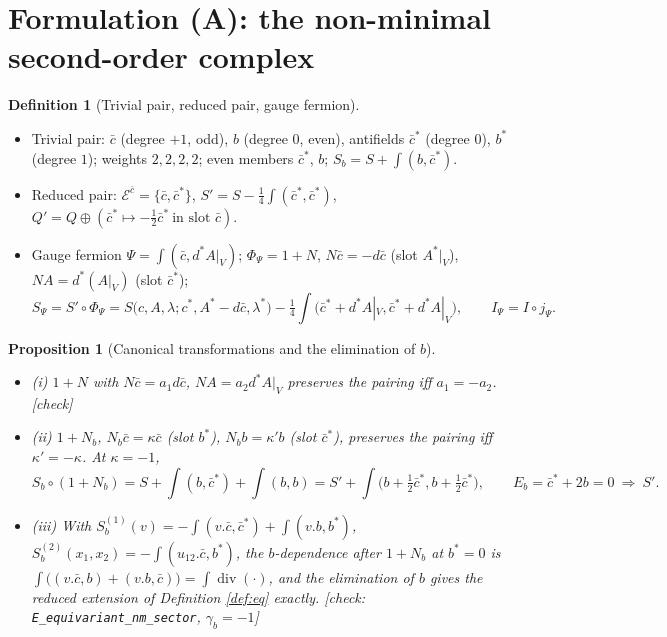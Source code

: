 \documentclass[11pt]{article}
\theoremstyle{plain}
\newtheorem{proposition}[theorem]{Proposition}
\theoremstyle{definition}
\newtheorem{definition}[theorem]{Definition}
\numberwithin{equation}{section}
\begin{document}
\section{Formulation (A): the non-minimal second-order complex}

\begin{definition}[Trivial pair, reduced pair, gauge fermion]
\label{def:A}
\begin{itemize}
\item Trivial pair: $\bar c$ (degree $+1$, odd), $b$ (degree $0$, even), antifields $\bar c^*$ (degree $0$), $b^*$ (degree $1$); weights $2,2,2,2$; even members $\bar c^*$, $b$; $S_b=S+\int(b,\bar c^*)$.
\item Reduced pair: $\mathscr E^{\bar c}=\{\bar c,\bar c^*\}$, $S'=S-\tfrac14\int(\bar c^*,\bar c^*)$, $Q'=Q\oplus(\bar c^*\mapsto-\tfrac12\bar c^*\ \text{in slot }\bar c)$.
\item Gauge fermion $\Psi=\int(\bar c,d^*A|_V)$; $\Phi_\Psi=1+N$, $N\bar c=-d\bar c$ (slot $A^*|_V$), $NA=d^*(A|_V)$ (slot $\bar c^*$);
\[
S_\Psi=S'\circ\Phi_\Psi=S\big(c,A,\lambda;c^*,A^*-d\bar c,\lambda^*\big)-\tfrac14\int\big(\bar c^*+d^*A|_V,\bar c^*+d^*A|_V\big),\qquad I_\Psi=I\circ j_\Psi .
\]
\end{itemize}
\end{definition}

\begin{proposition}[Canonical transformations and the elimination of $b$]
\label{prop:reduction}
\begin{itemize}
\item (i) $1+N$ with $N\bar c=a_1d\bar c$, $NA=a_2d^*A|_V$ preserves the pairing iff $a_1=-a_2$. [check]
\item (ii) $1+N_b$, $N_b\bar c=\kappa\bar c$ (slot $b^*$), $N_bb=\kappa'b$ (slot $\bar c^*$), preserves the pairing iff $\kappa'=-\kappa$. At $\kappa=-1$,
\[
S_b\circ(1+N_b)=S+\int(b,\bar c^*)+\int(b,b)=S'+\int\big(b+\tfrac12\bar c^*,b+\tfrac12\bar c^*\big),\qquad E_b=\bar c^*+2b=0\ \Rightarrow\ S' .
\]
\item (iii) With $S^{(1)}_b(v)=-\int(v.\bar c,\bar c^*)+\int(v.b,b^*)$, $S^{(2)}_b(x_1,x_2)=-\int(u_{12}.\bar c,b^*)$, the $b$-dependence after $1+N_b$ at $b^*=0$ is $\int\big((v.\bar c,b)+(v.b,\bar c)\big)=\int\operatorname{div}(\cdot)$, and the elimination of $b$ gives the reduced extension of Definition \ref{def:eq} exactly. [check: \texttt{E\_equivariant\_nm\_sector}, $\gamma_b=-1$]
\end{itemize}
\end{proposition}
\end{document}

